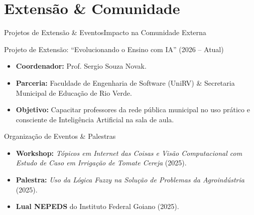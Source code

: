 \documentclass[9pt]{beamer}
\begin{document}
\section{Extensão \& Comunidade}
\begin{frame}{Projetos de Extensão \& Eventos}{Impacto na Comunidade Externa}
  \begin{block}{Projeto de Extensão: ``Evolucionando o Ensino com IA'' (2026 -- Atual)}
    \begin{itemize}
      \item \textbf{Coordenador:} Prof. Sergio Souza Novak.
      \item \textbf{Parceria:} Faculdade de Engenharia de Software (UniRV) \& Secretaria Municipal de Educação de Rio Verde.
      \item \textbf{Objetivo:} Capacitar professores da rede pública municipal no uso prático e consciente de Inteligência Artificial na sala de aula.
    \end{itemize}
  \end{block}

  \begin{block}{Organização de Eventos \& Palestras}
    \begin{itemize}
      \item \textbf{Workshop:} \textit{Tópicos em Internet das Coisas e Visão Computacional com Estudo de Caso em Irrigação de Tomate Cereja} (2025).
      \item \textbf{Palestra:} \textit{Uso da Lógica Fuzzy na Solução de Problemas da Agroindústria} (2025).
      \item \textbf{Lual NEPEDS} do Instituto Federal Goiano (2025).
    \end{itemize}
  \end{block}
\end{frame}

\end{document}
